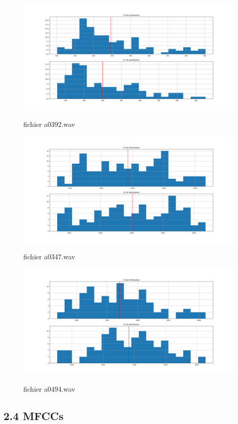 \documentclass[a4paper,12pt]{report}	%
\begin{document}
\begin{figure}[H]
	\centering
	{\includegraphics[scale=0.35]{figures/F1_distr_a0392.png}}
	\caption{fichier a0392.wav} 
\end{figure}
\begin{figure}[H]
	{\includegraphics[scale=0.35]{figures/F2_distr_a347.png}}
	\caption{fichier a0347.wav} 
\end{figure}
\begin{figure}[H]
	\centering
	{\includegraphics[scale=0.35]{figures/F2_distr_a494.png}}
	\caption{fichier a0494.wav} 
\end{figure}
{\subsection*{2.4 MFCCs}}
	
\end{document}
